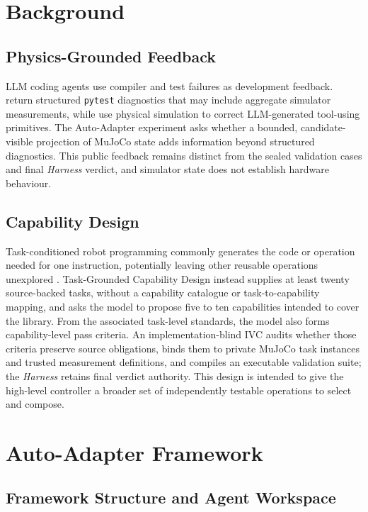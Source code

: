 \section{Background}

\subsection{Physics-Grounded Feedback}

LLM coding agents use compiler and test failures as development feedback.
\citet{tripathi2026testdriven} return structured \texttt{pytest} diagnostics
that may include aggregate simulator measurements, while
\citet{kim2026physicalcorrection} use physical simulation to correct
LLM-generated tool-using primitives. The Auto-Adapter experiment asks whether
a bounded, candidate-visible projection of MuJoCo state adds information beyond
structured diagnostics. This public feedback remains distinct from the sealed
validation cases and final \emph{Harness} verdict, and simulator state does not
establish hardware behaviour.

\subsection{Capability Design}

Task-conditioned robot programming commonly generates the code or operation
needed for one instruction, potentially leaving other reusable operations
unexplored \citep{liang2023codeaspolicies,mu2024robocodex}. Task-Grounded
Capability Design instead supplies at least twenty source-backed tasks, without
a capability catalogue or task-to-capability mapping, and asks the model to
propose five to ten capabilities intended to cover the library. From the
associated task-level standards, the model also forms capability-level pass
criteria. An implementation-blind IVC audits whether those criteria preserve
source obligations, binds them to private MuJoCo task instances and trusted
measurement definitions, and compiles an executable validation suite; the
\emph{Harness} retains final verdict authority. This design is intended to give
the high-level controller a broader set of independently testable operations
to select and compose.

\section{Auto-Adapter Framework}

\subsection{Framework Structure and Agent Workspace}

